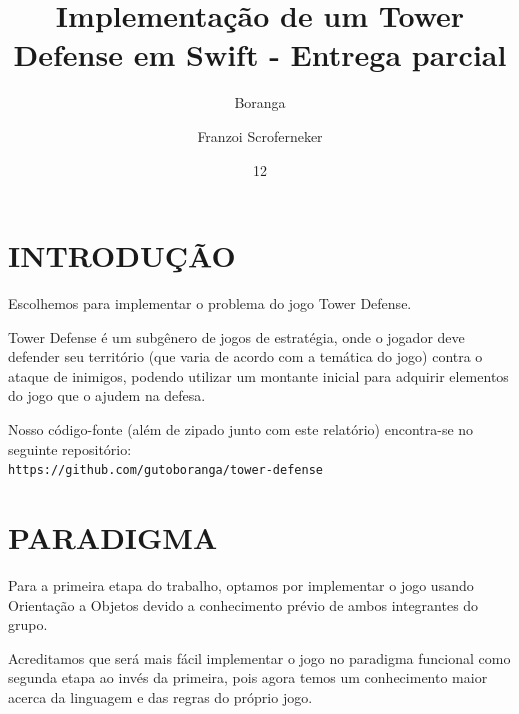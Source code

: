 \documentclass[rel_mlp]{iiufrgs}
\title{Implementação de um Tower Defense em Swift - Entrega parcial}
\author{Boranga}{Augusto} %
\author{Franzoi Scroferneker}{Rodrigo} %
\date{12}{2017}
\newcommand\tab[1][1cm]{\hspace*{#1}}
\begin{document}
\maketitle


\tableofcontents








%

\chapter{INTRODUÇÃO} \label{intro}

Escolhemos para implementar o problema do jogo Tower Defense.

Tower Defense é um subgênero de jogos de estratégia, onde o jogador deve defender seu território (que varia de acordo com a temática do jogo) contra o ataque de inimigos, podendo utilizar um montante inicial para adquirir elementos do jogo que o ajudem na defesa.

Nosso código-fonte (além de zipado junto com este relatório) encontra-se no seguinte repositório:
\texttt{\\\tab https://github.com/gutoboranga/tower-defense}


\chapter{PARADIGMA} \label{intro}

Para a primeira etapa do trabalho, optamos por implementar o jogo usando Orientação a Objetos devido a conhecimento prévio de ambos integrantes do grupo.

Acreditamos que será mais fácil implementar o jogo no paradigma funcional como segunda etapa ao invés da primeira, pois agora temos um conhecimento maior acerca da linguagem e das regras do próprio jogo.
\end{document}

